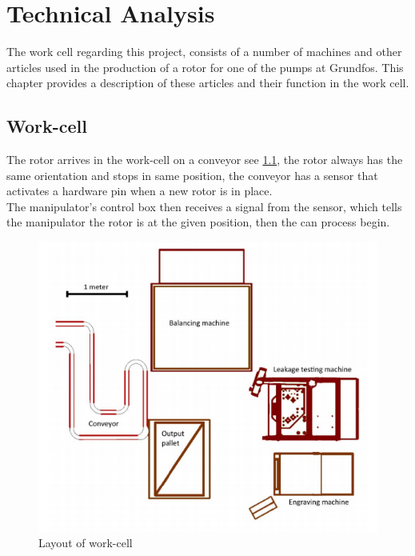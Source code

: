  \chapter{Technical Analysis} \label{TechAnalysis}
 
The work cell regarding this project, consists of a number of machines and other articles used in the production of a rotor for one of the pumps at Grundfos. This chapter provides a description of these articles and their function in the work cell\cite{robotsave}.\\
 

 \section{Work-cell}
 The rotor arrives in the work-cell on a conveyor see \ref{fig:Layoutworkcell}, the rotor always has the same orientation and stops in same position, the conveyor has a sensor that activates a hardware pin when a new rotor is in place.\\
 The manipulator's control box then receives a signal from the sensor, which tells the manipulator the rotor is at the given position, then the can process begin.\\
 
 \begin{figure}[h!]
    \centering
    \includegraphics[scale=.5]{TechnicalAnlysis/layout.PNG}
    \caption{Layout of work-cell\cite{Case}}
    \label{fig:Layoutworkcell}
\end{figure}

